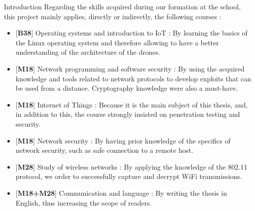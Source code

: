 \begin{chaptercover}{Introduction}
Regarding the skills acquired during our formation at the school, this project mainly applies, directly or indirectly, the following courses :
\begin{itemize}[itemsep=0.1cm,topsep=0.1cm]
  \hyphenation{}
  \item{} [{\color{FirstBlue}\bfseries B38}] Operating systems and introduction to IoT : By learning the basics of the Linux operating system and therefore allowing to have a better understanding of the architecture of the drones.
  \item{} [{\color{FirstBlue}\bfseries M18}] Network programming and software security : By using the acquired knowledge and tools related to network protocols to develop exploits that can be used from a distance. Cryptography knowledge were also a must-have.
  \item{} [{\color{FirstBlue}\bfseries M18}]  Internet of Things : Because it is the main subject of this thesis, and, in addition to this, the course strongly insisted on penetration testing and security.
  \item{} [{\color{FirstBlue}\bfseries M18}] Network security : By having prior knowledge of the specifics of network security, such as safe connection to a remote host.
  \item{} [{\color{FirstBlue}\bfseries M28}] Study of wireless networks : By applying the knowledge of the 802.11 protocol, we order to successfully capture and decrypt WiFi transmissions.
  \item{} [{\color{FirstBlue}\bfseries M18+M28}] Communication and language : By writing the thesis in English, thus increasing the scope of readers.
\end{itemize}


\end{chaptercover}
